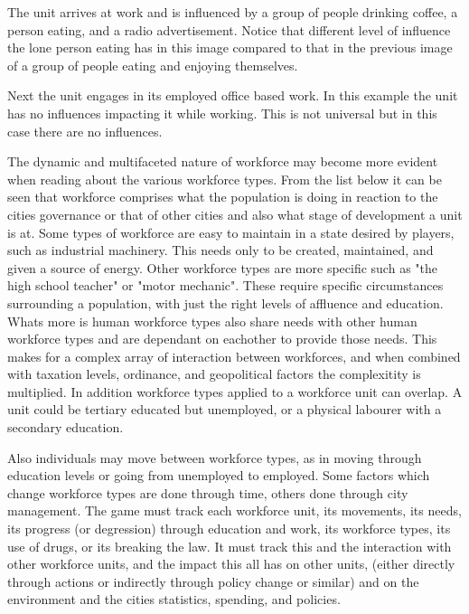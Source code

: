 The unit arrives at work and is influenced by a group of people drinking coffee, a person eating, and a radio advertisement. Notice that different level of influence the lone person eating has in this image compared to that in the previous image of a group of people eating and enjoying themselves.

Next the unit engages in its employed office based work. In this example the unit has no influences impacting it while working. This is not universal but in this case there are no influences.














The dynamic and multifaceted nature of workforce may become more evident when reading about the various workforce types. From the list below it can be seen that workforce comprises what the population is doing in reaction to the cities governance or that of other cities and also what stage of development a unit is at. Some types of workforce are easy to maintain in a state desired by players, such as industrial machinery. This needs only to be created, maintained, and given a source of energy. Other workforce types are more specific such as "the high school teacher" or "motor mechanic". These require specific circumstances surrounding a population, with just the right levels of affluence and education. Whats more is human workforce types also share needs with other human workforce types and are dependant on eachother to provide those needs. This makes for a complex array of interaction between workforces, and when combined with taxation levels, ordinance, and geopolitical factors the complexitity is multiplied. In addition workforce types applied to a workforce unit can overlap. A unit could be tertiary educated but unemployed, or a physical labourer with a secondary education. 

Also individuals may move between workforce types, as in moving through education levels or going from unemployed to employed. Some factors which change workforce types are done through time, others done through city management. The game must track each workforce unit, its movements, its needs, its progress (or degression) through education and work, its workforce types, its use of drugs, or its breaking the law. It must track this and the interaction with other workforce units, and the impact this all has on other units, (either directly through actions or indirectly through policy change or similar) and on the environment and the cities statistics, spending, and policies.



